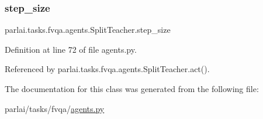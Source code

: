 \subsubsection{\texorpdfstring{step\+\_\+size}{step\_size}}
{\footnotesize\ttfamily parlai.\+tasks.\+fvqa.\+agents.\+Split\+Teacher.\+step\+\_\+size}



Definition at line 72 of file agents.\+py.



Referenced by parlai.\+tasks.\+fvqa.\+agents.\+Split\+Teacher.\+act().



The documentation for this class was generated from the following file\+:\begin{DoxyCompactItemize}
\item 
parlai/tasks/fvqa/\hyperlink{parlai_2tasks_2fvqa_2agents_8py}{agents.\+py}\end{DoxyCompactItemize}
